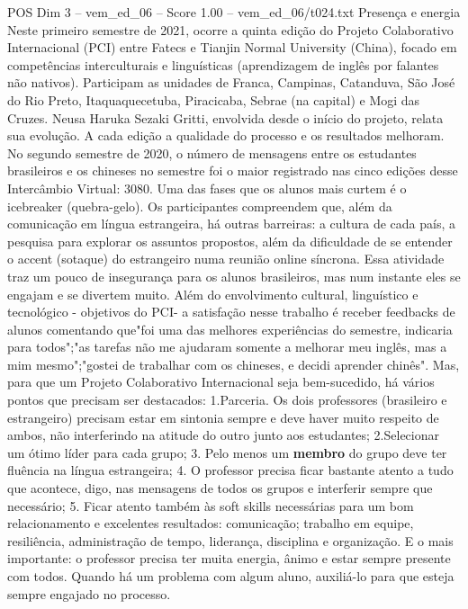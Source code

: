 \begin{textsample}{POS Dim 3 – vem\_ed\_06 – Score 1.00 – vem\_ed\_06/t024.txt}  \label{ex:f3_pos_128}
Presença e energia Neste primeiro semestre de 2021, ocorre a quinta edição do Projeto Colaborativo Internacional (PCI) entre Fatecs e Tianjin Normal University (China), focado em competências interculturais e linguísticas (aprendizagem de inglês por falantes não nativos).
Participam as unidades de Franca, Campinas, Catanduva, São José do Rio Preto, Itaquaquecetuba, Piracicaba, Sebrae (na capital) e Mogi das Cruzes.
Neusa Haruka Sezaki Gritti, envolvida desde o início do projeto, relata sua evolução.
A cada edição a qualidade do processo e os resultados melhoram.
No segundo semestre de 2020, o número de mensagens entre os estudantes brasileiros e os chineses no semestre foi o maior registrado nas cinco edições desse Intercâmbio Virtual: 3080.
Uma das fases que os alunos mais curtem é o icebreaker (quebra-gelo).
Os participantes compreendem que, além da comunicação em língua estrangeira, há outras barreiras: a cultura de cada país, a pesquisa para explorar os assuntos propostos, além da dificuldade de se entender o accent (sotaque) do estrangeiro numa reunião online síncrona.
Essa atividade traz um pouco de insegurança para os alunos brasileiros, mas num instante eles se engajam e se divertem muito.
Além do envolvimento cultural, linguístico e tecnológico - objetivos do PCI- a satisfação nesse trabalho é receber feedbacks de alunos comentando que"foi uma das melhores experiências do semestre, indicaria para todos";"as tarefas não me ajudaram somente a melhorar meu inglês, mas a mim mesmo";"gostei de trabalhar com os chineses, e decidi aprender chinês".
Mas, para que um Projeto Colaborativo Internacional seja bem-sucedido, há vários pontos que precisam ser destacados: 1.Parceria.
Os dois professores (brasileiro e estrangeiro) precisam estar em sintonia sempre e deve haver muito respeito de ambos, não interferindo na atitude do outro junto aos estudantes; 2.Selecionar um ótimo líder para cada grupo; 3.
Pelo menos um \textbf{membro} do grupo deve ter fluência na língua estrangeira; 4.
O professor precisa ficar bastante atento a tudo que acontece, digo, nas mensagens de todos os grupos e interferir sempre que necessário; 5.
Ficar atento também às soft skills necessárias para um bom relacionamento e excelentes resultados: comunicação; trabalho em equipe, resiliência, administração de tempo, liderança, disciplina e organização.
E o mais importante: o professor precisa ter muita energia, ânimo e estar sempre presente com todos.
Quando há um problema com algum aluno, auxiliá-lo para que esteja sempre engajado no processo.

\end{textsample}
